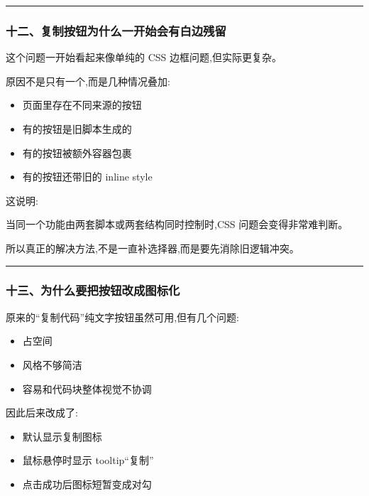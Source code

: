 \documentclass[lang=cn,scheme=chinese,color=blue,device=normal,toc=onecol,math=cm]{elegantbook}
\begin{document}
\medskip\hrule\medskip


\subsubsection{十二、复制按钮为什么一开始会有白边残留}


这个问题一开始看起来像单纯的 CSS 边框问题,但实际更复杂。\par


原因不是只有一个,而是几种情况叠加:\par


\begin{itemize}
\item 页面里存在不同来源的按钮
\item 有的按钮是旧脚本生成的
\item 有的按钮被额外容器包裹
\item 有的按钮还带旧的 inline style
\end{itemize}


这说明:\par


\begin{quotebox}
当同一个功能由两套脚本或两套结构同时控制时,CSS 问题会变得非常难判断。\par
\end{quotebox}


所以真正的解决方法,不是一直补选择器,而是要先消除旧逻辑冲突。\par


\medskip\hrule\medskip


\subsubsection{十三、为什么要把按钮改成图标化}


原来的“复制代码”纯文字按钮虽然可用,但有几个问题:\par


\begin{itemize}
\item 占空间
\item 风格不够简洁
\item 容易和代码块整体视觉不协调
\end{itemize}


因此后来改成了:\par


\begin{itemize}
\item 默认显示复制图标
\item 鼠标悬停时显示 tooltip“复制”
\item 点击成功后图标短暂变成对勾
\end{itemize}
\end{document}
